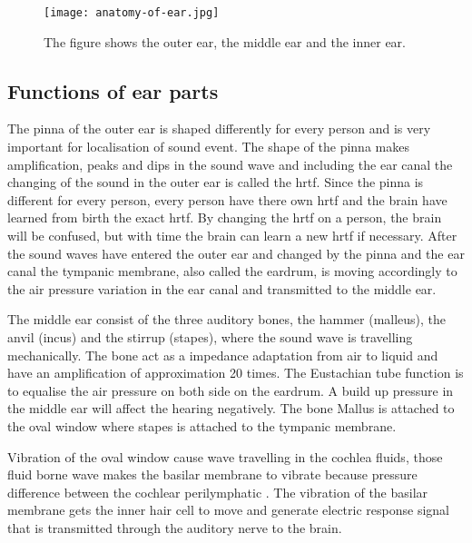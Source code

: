  \begin{figure}[H]
	\centering
		\texttt{[image: anatomy-of-ear.jpg]}
		\caption{The figure shows the outer ear, the middle ear and the inner ear.}
		\label{fig:hearing_system}
\end{figure}

\subsection{Functions of ear parts}
The pinna of the outer ear is shaped differently for every person and is very important for localisation of sound event. The shape of the pinna makes amplification, peaks and dips in the sound wave and including the ear canal the changing of the sound in the outer ear is called the \gls{hrtf}. Since the pinna is different for every person, every person have there own \gls{hrtf} and the brain have learned from birth the exact \gls{hrtf}. By changing the \gls{hrtf} on a person, the brain will be confused, but with time the brain can learn a new \gls{hrtf} if necessary. After the sound waves have entered the outer ear and changed by the pinna and the ear canal the tympanic membrane, also called the eardrum, is moving accordingly to the air pressure variation in the ear canal and transmitted to the middle ear.  

The middle ear consist of the three auditory bones, the hammer (malleus), the anvil (incus) and the stirrup (stapes), where the sound wave is travelling mechanically. The bone act as a impedance adaptation from air to liquid and have an amplification of approximation 20 times. The Eustachian tube function is to equalise the air pressure on both side on the eardrum. A build up pressure in the middle ear will affect the hearing negatively. The bone Mallus is attached to the oval window where stapes is attached to the tympanic membrane.

Vibration of the oval window cause wave travelling in the cochlea fluids, those fluid borne wave makes the basilar membrane to vibrate because pressure difference between the cochlear perilymphatic \citep{ho_2017}. The vibration of the basilar membrane gets the inner hair cell to move and generate electric response signal that is transmitted through the auditory nerve to the brain.



